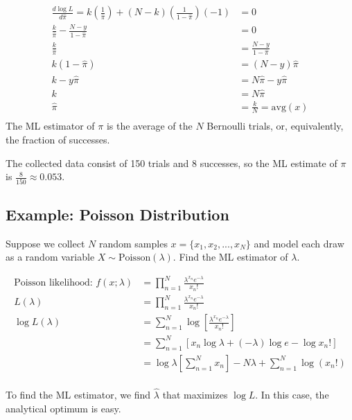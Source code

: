 \documentclass[
]{book}
\begin{document}
\[
\begin{aligned}
\frac{d \log L}{d\hat{\pi}} = k \left( \frac{1}{\hat{\pi}}\right) + (N - k) \left( \frac{1}{1 - \hat{\pi}}\right)(-1) &= 0\\
\frac{k}{\hat{\pi}} - \frac{N - y}{1 - \hat{\pi}} &= 0 \\
\frac{k}{\hat{\pi}} &= \frac{N - y}{1 - \hat{\pi}} \\
k(1 - \hat{\pi}) &= (N - y)\hat{\pi} \\
k - y\hat{\pi} &= N\hat{\pi} - y\hat{\pi} \\
k  &= N\hat{\pi} \\
\hat{\pi} &= \frac{k}{N} = \text{avg}(x)\\
\end{aligned}
\]
The ML estimator of \(\pi\) is the average of the \(N\) Bernoulli trials, or, equivalently, the fraction of successes.

The collected data consist of 150 trials and 8 successes, so the ML estimate of \(\pi\) is \(\frac{8}{150} \approx 0.053\).

\hypertarget{example-poisson-distribution}{%
\subsection{Example: Poisson Distribution}\label{example-poisson-distribution}}

Suppose we collect \(N\) random samples \(x = \{x_1, x_2, ..., x_N\}\) and model each draw as a random variable \(X \sim \text{Poisson}(\lambda)\). Find the ML estimator of \(\lambda\).

\[
\begin{aligned}
\text{Poisson likelihood: } f(x; \lambda) &= \prod_{n = 1}^N \frac{\lambda^{x_n} e^{-\lambda}}{x_n!} \\
L(\lambda) &= \prod_{n = 1}^N \frac{\lambda^{x_n} e^{-\lambda}}{x_n!} \\
\log L(\lambda) &= \sum_{n = 1}^N \log \left[ \frac{\lambda^{x_n} e^{-\lambda}}{x_n!} \right]\\
&= \sum_{n = 1}^N \left[ x_n \log \lambda + (-\lambda) \log e - \log x_n! \right]\\
&= \log \lambda \left[ \sum_{n = 1}^N x_n \right]  -N\lambda + \sum_{n = 1}^N \log (x_n!) \\
\end{aligned}
\]

To find the ML estimator, we find \(\hat{\lambda}\) that maximizes \(\log L\). In this case, the analytical optimum is easy.
\end{document}

